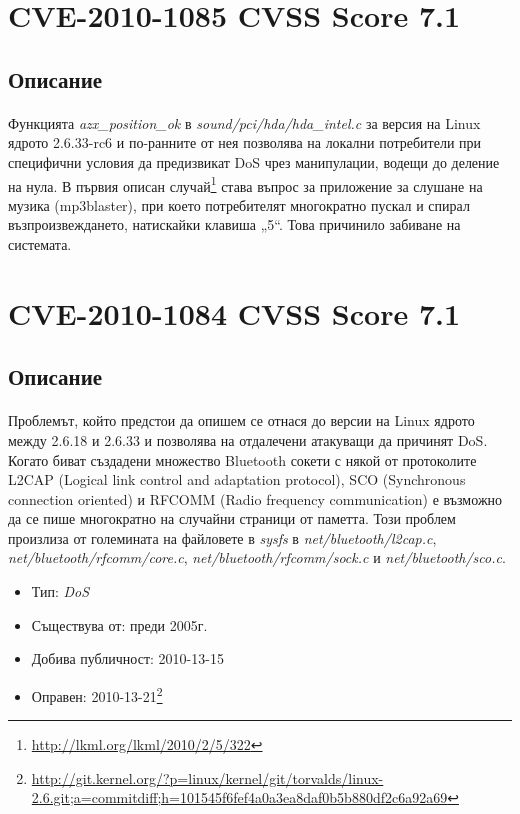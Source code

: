 \documentclass[a4paper,12pt,leqno]{article}
\begin{document}
\section{CVE-2010-1085 CVSS Score 7.1}
\subsection{Описание}
\paragraph{}
Функцията \textit{azx\_position\_ok} в \textit{sound/pci/hda/hda\_intel.c} за версия на Linux ядрото 
2.6.33-rc6 и по-ранните от нея позволява на локални потребители при 
специфични условия да предизвикат DoS чрез манипулации, водещи до 
деление на нула. В първия описан случай\footnote{\url{http://lkml.org/lkml/2010/2/5/322}}
 става въпрос за приложение за 
слушане на музика (mp3blaster), при което потребителят многократно пускал 
и спирал възпроизвеждането, натискайки клавиша „5“. Това причинило 
забиване на системата.


\section{CVE-2010-1084 CVSS Score 7.1}
\subsection{Описание}
\paragraph{}
Проблемът, който предстои да опишем се отнася до версии на Linux ядрото 
между 2.6.18 и 2.6.33 и позволява на отдалечени атакуващи да причинят DoS. 
Когато биват създадени множество Bluetooth сокети с някой от протоколите 
L2CAP (Logical link control and adaptation protocol), SCO (Synchronous connection 
oriented) и RFCOMM (Radio frequency communication) е възможно да се пише 
многократно на случайни страници от паметта. Този проблем произлиза от 
големината на файловете в \textit{sysfs} в \textit{net/bluetooth/l2cap.c}, 
\textit{net/bluetooth/rfcomm/core.c}, \textit{net/bluetooth/rfcomm/sock.c} и \textit{net/bluetooth/sco.c}. 

\begin{itemize}
    \item Тип: \textit{DoS}
    \item Съществува от: преди 2005г.
  	\item Добива публичност: 2010-13-15
    \item Оправен: 2010-13-21\footnote{\url{http://git.kernel.org/?p=linux/kernel/git/torvalds/linux-2.6.git;a=commitdiff;h=101545f6fef4a0a3ea8daf0b5b880df2c6a92a69}}
\end{itemize}
\end{document}
